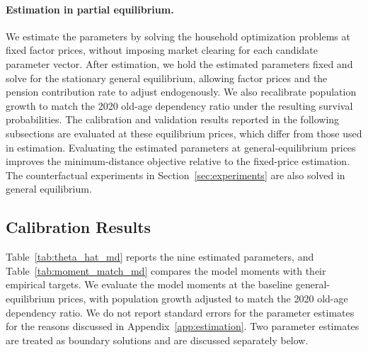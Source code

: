 \documentclass[12pt,a4paper]{article}
\begin{document}
\paragraph{Estimation in partial equilibrium.}
We estimate the parameters by solving the household optimization problems at fixed factor prices, without imposing market clearing for each candidate parameter vector. After estimation, we hold the estimated parameters fixed and solve for the stationary general equilibrium, allowing factor prices and the pension contribution rate to adjust endogenously. We also recalibrate population growth to match the 2020 old-age dependency ratio under the resulting survival probabilities. The calibration and validation results reported in the following subsections are evaluated at these equilibrium prices, which differ from those used in estimation. Evaluating the estimated parameters at general-equilibrium prices improves the minimum-distance objective relative to the fixed-price estimation. The counterfactual experiments in Section~\ref{sec:experiments} are also solved in general equilibrium.

\subsection{Calibration Results}
\label{subsec:calibration_results}

Table~\ref{tab:theta_hat_md} reports the nine estimated parameters, and Table~\ref{tab:moment_match_md} compares the model moments with their empirical targets. We evaluate the model moments at the baseline general-equilibrium prices, with population growth adjusted to match the 2020 old-age dependency ratio. We do not report standard errors for the parameter estimates for the reasons discussed in Appendix~\ref{app:estimation}. Two parameter estimates are treated as boundary solutions and are discussed separately below.
\end{document}
